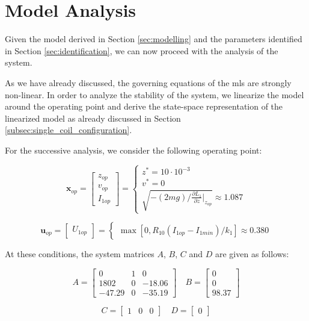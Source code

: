 \section{Model Analysis}
\label{sec:model_analysis}

Given the model derived in Section \ref{sec:modelling} and the parameters identified in Section \ref{sec:identification}, we can now proceed with the analysis of the system.

As we have already discussed, the governing equations of the \acrshort{mls} are strongly non-linear.
In order to analyze the stability of the system, we linearize the model around the operating point and derive the state-space representation of the linearized model as already discussed in Section \ref{subsec:single_coil_configuration}.

For the successive analysis, we consider the following operating point:

\begin{equation}
    \mathbf{x}_{op} =
    \begin{bmatrix}
        z_{op} \\
        v_{op} \\
        I_{1op}
    \end{bmatrix}
    =
    \begin{cases}
        z^* =  10 \cdot 10^{-3} \\
        v^* = 0                 \\
        \sqrt{ -(2m g) / \frac{\partial L_1}{\partial z} \big|_{z_{op}} } \approx 1.087
    \end{cases}
\end{equation}

\begin{equation}
    \mathbf{u}_{op} =
    \begin{bmatrix}
        U_{1op}
    \end{bmatrix}
    =
    \begin{cases}
        \max{\left[0, R_{10} \left( I_{1op} - I_{1min} \right) / k_1 \right]} \approx 0.380
    \end{cases}
\end{equation}

At these conditions, the system matrices $A$, $B$, $C$ and $D$ are given as follows:

\begin{equation}
    A =
    \begin{bmatrix}
        0      & 1 & 0      \\
        1802   & 0 & -18.06 \\
        -47.29 & 0 & -35.19
    \end{bmatrix}
    \quad
    B =
    \begin{bmatrix}
        0 \\
        0 \\
        98.37
    \end{bmatrix}
\end{equation}

\begin{equation}
    C =
    \begin{bmatrix}
        1 & 0 & 0
    \end{bmatrix}
    \quad
    D =
    \begin{bmatrix}
        0
    \end{bmatrix}
\end{equation}



